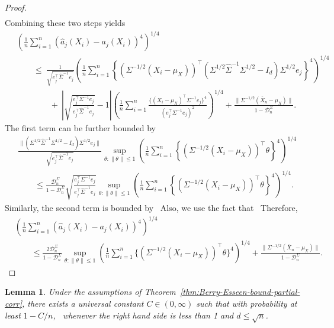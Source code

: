 \documentclass{article}
\newtheorem{lemma}{Lemma}
\begin{document}
\begin{appendices}
\begin{proof}
\begin{align*}
 \end{align*}
 Combining these two steps yields
 \begin{align*}
 &\left(\frac{1}{n}\sum_{i=1}^n (\widehat{a}_j(X_i) - a_j(X_i))^4\right)^{1/4}\\ ~&\qquad\le~ \frac{1}{\sqrt{e_j^{\top}\widehat{\Sigma}^{-1}e_j}}\left(\frac{1}{n}\sum_{i=1}^n \left\{(\Sigma^{-1/2}(X_i - \mu_X))^{\top}(\Sigma^{1/2}\widehat{\Sigma}^{-1}\Sigma^{1/2} - I_d)\Sigma^{1/2}e_j\right\}^4\right)^{1/4}\\
 ~&\qquad\qquad+~ \left|\sqrt{\frac{e_j^{\top}\Sigma^{-1}e_j}{e_j^{\top}\widehat{\Sigma}^{-1}e_j}} - 1\right|\left(\frac{1}{n}\sum_{i=1}^n \frac{\{(X_i - \mu_X)^{\top}\Sigma^{-1}e_j\}^4}{(e_j^{\top}\Sigma^{-1}e_j)^2}\right)^{1/4} + \frac{\|\Sigma^{-1/2}(\overline{X}_n - \mu_X)\|}{1 - \mathcal{D}_n^{\Sigma}}.
 \end{align*}
 The first term can be further bounded by
 \begin{align*}
 &\frac{\|(\Sigma^{1/2}\widehat{\Sigma}^{-1}\Sigma^{1/2} - I_d)\Sigma^{1/2}e_j\|}{\sqrt{e_j^{\top}\widehat{\Sigma}^{-1}e_j}}\sup_{\theta:\|\theta\| \le 1}\left(\frac{1}{n}\sum_{i=1}^n \left\{(\Sigma^{-1/2}(X_i - \mu_X))^{\top}\theta\right\}^4\right)^{1/4}\\
 &\qquad\le \frac{\mathcal{D}_n^{\Sigma}}{1 - \mathcal{D}_n^{\Sigma}}\sqrt{\frac{e_j^{\top}\Sigma^{-1}e_j}{e_j^{\top}\widehat{\Sigma}^{-1}e_j}}\sup_{\theta:\|\theta\| \le 1}\left(\frac{1}{n}\sum_{i=1}^n \left\{(\Sigma^{-1/2}(X_i - \mu_X))^{\top}\theta\right\}^4\right)^{1/4}.
 \end{align*}
 Similarly, the second term is bounded by
 \
 Also, we use the fact that
 \
 Therefore,
 \begin{align*}
 &\left(\frac{1}{n}\sum_{i=1}^n (\widehat{a}_j(X_i) - a_j(X_i))^4\right)^{1/4}\\ &\qquad\le \frac{2\mathcal{D}_n^{\Sigma}}{1 - \mathcal{D}_n^{\Sigma}}\sup_{\theta:\|\theta\| \le 1}\left(\frac{1}{n}\sum_{i=1}^n{\{(\Sigma^{-1/2}(X_i - \mu_X))^{\top}\theta\}^4}\right)^{1/4} + \frac{\|\Sigma^{-1/2}(\overline{X}_n - \mu_X)\|}{1 - \mathcal{D}_n^{\Sigma}}.
 \end{align*}
 \end{proof}
 \begin{lemma}\label{lem:rate-of-convergence-psihat-minus-psi}
 Under the assumptions of Theorem~\ref{thm:Berry-Esseen-bound-partial-corr}, there exists a universal constant $C\in(0,\infty)$ such that with probability at least $1 - C/n$,
 \
 whenever the right hand side is less than 1 and $d \le \sqrt{n}$. 

\end{lemma}
\end{appendices}
\end{document}
